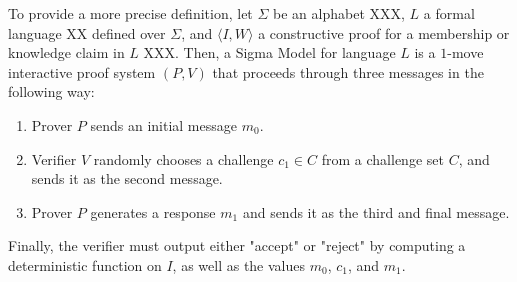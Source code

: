 To provide a more precise definition, let $\Sigma$ be an alphabet XXX, $L$ a formal language XX defined over $\Sigma$, and $\langle I, W\rangle$ a constructive proof for a membership or knowledge claim in $L$ XXX. Then, a Sigma Model for language $L$ is a $1$-move interactive proof system $(P,V)$ that proceeds through three messages in the following way:
\begin{enumerate}
\label{def_sigma-model}
\item Prover $P$ sends an initial message $m_0$.
\item Verifier $V$ randomly chooses a challenge $c_1\in C$ from a challenge set $C$, and sends it as the second message.
\item Prover $P$ generates a response $m_1$ and sends it as the third and final message.
\end{enumerate}
Finally, the verifier must output either "accept" or "reject" by computing a deterministic function on $I$, as well as the values $m_0$, $c_1$, and $m_1$.
